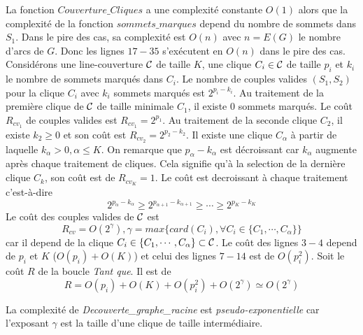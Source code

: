 La fonction $Couverture\_Cliques$ a une complexit\'e constante $O(1)$ alors que la complexit\'e de la  fonction $sommets\_marques$ depend du nombre de sommets dans $S_1$. Dans le pire des cas, sa complexit\'e est $O(n)$ avec $n = E(G)$ le nombre  d'arcs de $G$. Donc les lignes $17-35$ s'ex\'ecutent en $O(n)$ dans le pire des cas. 
\newline
Consid\'erons une line-couverture ${\cal C}$  de taille $K$,  une clique $C_i \in {\cal C}$ de taille $p_i$ et $k_i$ le nombre de sommets marqu\'es dans $C_i$. 
\newline
Le nombre de couples valides $(S_1,S_2)$ pour la clique $C_i$ avec $k_i$ sommets marqu\'es est $2^{p_i -k_i}$. 
Au traitement de la premi\`ere clique de ${\cal C}$ de taille minimale $C_1$, il existe $0$ sommets marqu\'es. Le co\^ut $R_{cv_1}$ de couples valides est $R_{cv_1} = 2^{p_1}$.
Au traitement de la seconde clique $C_2$, il existe $k_2 \ge 0$ et son co\^ut est  $R_{cv_2} = 2^{p_2 - k_2}$.
Il existe une clique $C_\alpha$ \`a partir de laquelle $k_\alpha > 0, \alpha \le K$.
On remarque que $p_\alpha - k_\alpha$ est d\'ecroissant car $k_\alpha$ augmente apr\`es chaque traitement de cliques. 
Cela signifie qu'\`a la selection de la derni\`ere clique $C_k$, son co\^ut  est de $R_{cv_K} = 1$. 
Le co\^ut est decroissant \`a chaque traitement c'est-\`a-dire 
$$2^{p_{\alpha} - k_{\alpha}} \ge 2^{p_{\alpha+1} - k_{\alpha+1}} \ge \cdots \ge 2^{p_K - k_K}$$ 
Le co\^ut des couples valides de ${\cal C}$ est 
$$R_{cv} = O(2^\gamma), \gamma = max\{card(C_i), \forall C_i  \in \{C_1, \cdots, C_\alpha\} \}$$
car il depend de la clique $C_i \in \{C_1, \cdots, C_\alpha\} \subset {\cal C}$.
\newline
Le co\^ut des lignes $3-4$ depend de $p_i$ et $K$ ($O(p_i) + O(K)$) et celui des lignes $7-14$ est de $O(p_i^2)$.
\newline
Soit le co\^ut $R$ de la boucle  {\em Tant que}. Il est de 
$$ R = O(p_i) + O(K) + O(p_i^2) + O(2^\gamma) \simeq O(2^\gamma)$$

La complexit\'e de {\em Decouverte\_graphe\_racine} est {\em pseudo-exponentielle} car l'exposant $\gamma$ est la taille d'une clique de taille interm\'ediaire.

